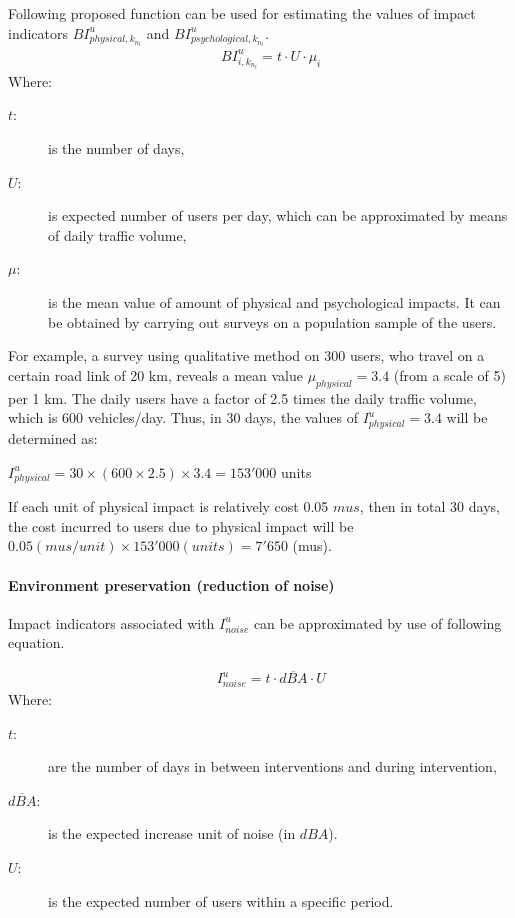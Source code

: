 Following proposed function can be used for estimating the values of impact indicators $BI^u_{physical, k_{n_l}}$ and $BI^u_{psychological, k_{n_l}}$.
\begin{eqnarray}
      && BI^u_{i,k_{n_l}} = t\cdot U\cdot \mu_i \label{operation3}
\end{eqnarray}
Where:
\begin{adjustwidth}{1cm}{}
\begin{description}
\item[$t$:] is the number of days,
\item[$U$:] is expected number of users per day, which can be approximated by means of daily traffic volume,
\item[$\mu$:] is the mean value of amount of physical and psychological impacts. It can be obtained by carrying out surveys on a population sample of the users.
\end{description}
\end{adjustwidth}

For example, a survey using qualitative method on 300 users, who travel on a certain road link of 20 km, reveals a mean value $\mu_{physical}=3.4$ (from a scale of 5) per 1 km. The daily users have a factor of 2.5 times the daily traffic volume, which is 600 vehicles/day. Thus, in 30 days, the values of $I^u_{physical}=3.4$ will be determined as:

$I^u_{physical} = 30 \times (600 \times 2.5) \times 3.4 = 153'000 $ units

If each unit of physical impact is relatively cost 0.05 $mus$, then in total 30 days, the cost incurred to users due to physical impact will be $0.05(mus/unit)\times 153'000 (units)=7'650$  (mus).

\paragraph{Environment preservation (reduction of noise)}

Impact indicators associated with $I_{noise}^u$ can be approximated by use of following equation.

\begin{eqnarray}
      && I^u_{noise} = t\cdot \overline{dBA} \cdot U \label{operation4}
\end{eqnarray}
Where:
\begin{adjustwidth}{1cm}{}
\begin{description}
\item[$t$:] are the number of days in between interventions and during intervention,
\item[$\overline{dBA}$:] is the expected increase unit of noise (in $dBA$).
\item[$U$:] is the expected number of users within a specific period.
\end{description}
\end{adjustwidth}

